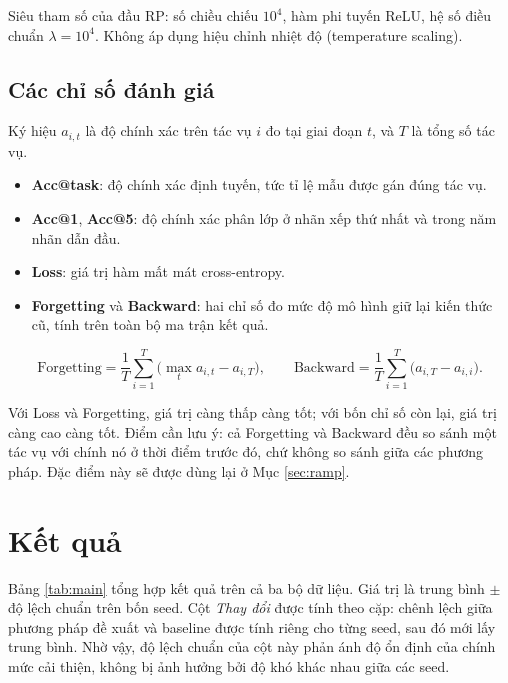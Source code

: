 \documentclass[11pt,a4paper]{article}
\begin{document}
Siêu tham số của đầu RP: số chiều chiếu $10^4$, hàm phi tuyến ReLU, hệ số điều
chuẩn $\lambda = 10^4$. Không áp dụng hiệu chỉnh nhiệt độ (temperature scaling).

\subsection{Các chỉ số đánh giá}

Ký hiệu $a_{i,t}$ là độ chính xác trên tác vụ $i$ đo tại giai đoạn $t$, và $T$
là tổng số tác vụ.

\begin{itemize}[leftmargin=*, itemsep=2pt]
\item \textbf{Acc@task}: độ chính xác định tuyến, tức tỉ lệ mẫu được gán đúng
      tác vụ.
\item \textbf{Acc@1}, \textbf{Acc@5}: độ chính xác phân lớp ở nhãn xếp thứ nhất
      và trong năm nhãn dẫn đầu.
\item \textbf{Loss}: giá trị hàm mất mát cross-entropy.
\item \textbf{Forgetting} và \textbf{Backward}: hai chỉ số đo mức độ mô hình giữ
      lại kiến thức cũ, tính trên toàn bộ ma trận kết quả.
\end{itemize}

\begin{equation}
\mathrm{Forgetting} = \frac{1}{T}\sum_{i=1}^{T}
\Big( \max_{t} a_{i,t} - a_{i,T} \Big),
\qquad
\mathrm{Backward} = \frac{1}{T}\sum_{i=1}^{T} \big( a_{i,T} - a_{i,i} \big).
\end{equation}

Với Loss và Forgetting, giá trị càng thấp càng tốt; với bốn chỉ số còn lại, giá
trị càng cao càng tốt. Điểm cần lưu ý: cả Forgetting và Backward đều so sánh một
tác vụ với chính nó ở thời điểm trước đó, chứ không so sánh giữa các phương
pháp. Đặc điểm này sẽ được dùng lại ở Mục \ref{sec:ramp}.

\section{Kết quả}
\label{sec:results}

Bảng \ref{tab:main} tổng hợp kết quả trên cả ba bộ dữ liệu. Giá trị là trung
bình $\pm$ độ lệch chuẩn trên bốn seed. Cột \emph{Thay đổi} được tính theo cặp:
chênh lệch giữa phương pháp đề xuất và baseline được tính riêng cho từng seed,
sau đó mới lấy trung bình. Nhờ vậy, độ lệch chuẩn của cột này phản ánh độ ổn
định của chính mức cải thiện, không bị ảnh hưởng bởi độ khó khác nhau giữa các
seed.
\end{document}
